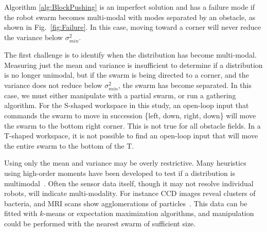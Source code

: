 Algorithm \ref{alg:BlockPushing} is an imperfect solution and has a failure mode if the robot swarm becomes multi-modal with modes separated by an obstacle, as shown in Fig.~\ref{fig:Failure}.  In this case, moving toward a corner will never reduce the variance below $\sigma_{min}^2$.


  The first challenge is to identify when the distribution has become multi-modal.  Measuring just the mean and variance is insufficient to determine if a distribution is no longer unimodal, but if the swarm is being directed to a corner, and the variance does not reduce below $\sigma_{min}^2$, the swarm has become separated. In this case, we must either manipulate with a partial swarm, or run a gathering algorithm.  For the  {\sffamily S}-shaped workspace in this study, an open-loop input that commands the swarm to move in succession \{{\sc left, down, right, down}\} will move the swarm to the bottom right corner.
This is not true for all obstacle fields. In a {\sffamily T}-shaped workspace, it is not possible to find an open-loop input that will move the entire swarm to the bottom of the {\sffamily T}.  
 
  Using only the mean and variance may be overly restrictive.  Many heuristics using high-order moments have been developed to test if a distribution is multimodal~\cite{haldane1951simple}.  Often the sensor data itself, though it may not resolve individual robots, will indicate multi-modality.  For instance CCD images reveal clusters of bacteria, and MRI scans show agglomerations of particles~\cite{stuber2007positive}.  This data can be fitted with $k$-means or expectation maximization algorithms, and manipulation could be performed with the nearest swarm of sufficient size.
  








